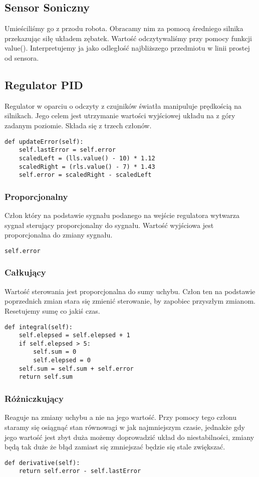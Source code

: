\documentclass[paper=a4, fontsize=11pt]{scrartcl} %
\numberwithin{equation}{section} %
\numberwithin{figure}{section} %
\numberwithin{table}{section} %
\begin{document}
\subsection{Sensor Soniczny}
Umieściliśmy go z przodu robota. Obracamy nim za pomocą średniego silnika przekazując siłę układem zębatek. Wartość odczytywaliśmy przy pomocy funkcji value(). Interpretujemy ja jako odległość najbliższego przedmiotu w linii prostej od sensora.
\subsection{Regulator PID}
Regulator w oparciu o odczyty z czujników światła manipuluje prędkością na silnikach. Jego celem jest utrzymanie wartości wyjściowej układu na z góry zadanym poziomie. Składa się z trzech członów.
\begin{lstlisting} 
def updateError(self):
	self.lastError = self.error
	scaledLeft = (lls.value() - 10) * 1.12
	scaledRight = (rls.value() - 7) * 1.43 
	self.error = scaledRight - scaledLeft
\end{lstlisting} 
\subsubsection{Proporcjonalny}
Człon który na podstawie sygnału podanego na wejście regulatora wytwarza sygnał sterujący proporcjonalny do sygnału. Wartość wyjściowa jest proporcjonalna do zmiany sygnału.  
\begin{lstlisting} 
self.error
\end{lstlisting} 
\subsubsection{Całkujący}
Wartość sterowania jest proporcjonalna do sumy uchybu. Człon ten na podstawie poprzednich zmian stara się zmienić sterowanie, by zapobiec przyszłym zmianom. Resetujemy sumę co jakiś czas. 
\begin{samepage}
\begin{lstlisting} 
def integral(self):
	self.elepsed = self.elepsed + 1
	if self.elepsed > 5:
		self.sum = 0
		self.elepsed = 0  
	self.sum = self.sum + self.error
	return self.sum   
\end{lstlisting}
\end{samepage}
\subsubsection{Różniczkujący }
Reaguje na zmiany uchybu a nie na jego wartość. Przy pomocy tego członu staramy  się osiągnąć stan równowagi w jak najmniejszym czasie, jednakże gdy jego wartość jest zbyt duża możemy doprowadzić układ do niestabilności, zmiany będą tak duże że błąd zamiast się zmniejszać będzie się  stale zwiększać.  
\begin{lstlisting} 
def derivative(self):
	return self.error - self.lastError
\end{lstlisting}
\end{document}
